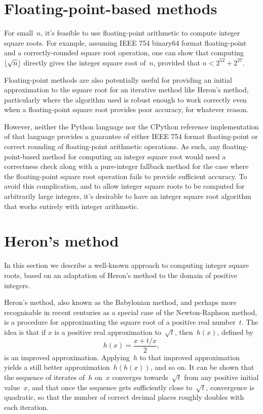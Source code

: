 \documentclass[a4paper]{article}
\DeclarePairedDelimiter\floor{\lfloor}{\rfloor}
\theoremstyle{plain}
\theoremstyle{definition}
\begin{document}
\section{Floating-point-based methods}
\label{float_method}

For small~$n$, it's feasible to use floating-point arithmetic to
compute integer square roots. For example, assuming IEEE 754 binary64 format
floating-point and a correctly-rounded square root operation, one can show that
computing $\floor{\sqrt n}$ directly gives the integer square root of~$n$,
provided that $n < 2^{52} + 2^{27}$.

Floating-point methods are also potentially useful for providing an initial
approximation to the square root for an iterative method like Heron's method,
particularly where the algorithm used is robust enough to work correctly even
when a floating-point square root provides poor accuracy, for whatever reason.

However, neither the Python language nor the CPython reference implementation
of that language provides a guarantee of either IEEE 754 format floating-point
or correct rounding of floating-point arithmetic operations. As such, any
floating-point-based method for computing an integer square root would need a
correctness check along with a pure-integer fallback method for the case where
the floating-point square root operation fails to provide sufficient accuracy.
To avoid this complication, and to allow integer square roots to be computed
for arbitrarily large integers, it's desirable to have an integer square root
algorithm that works entirely with integer arithmetic.

\section{Heron's method}
\label{old_method}

In this section we describe a well-known approach to computing integer square
roots, based on an adaptation of Heron's method to the domain of positive
integers.

Heron's method, also known as the Babylonian method, and perhaps more
recognisable in recent centuries as a special case of the Newton-Raphson
method, is a procedure for approximating the square root of a positive
real number~$t$. The idea is that if $x$ is a positive real
approximation to~$\sqrt t$, then~$h(x)$, defined by
$$h(x) = \frac{x + t/x}2,$$ is an improved approximation. Applying~$h$ to that
improved approximation yields a still better approximation~$h(h(x))$, and so
on. It can be shown that the sequence of iterates of~$h$ on~$x$ converges
towards~$\sqrt t$ from any positive initial value~$x$, and that once the
sequence gets sufficiently close to~$\sqrt t$, convergence is quadratic, so
that the number of correct decimal places roughly doubles with each iteration.
\end{document}
